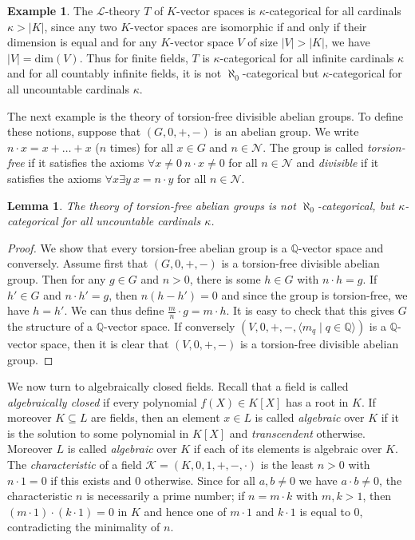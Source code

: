 \documentclass[10pt]{amsart}
\renewcommand{\L}{\mathcal{L}}
\newcommand{\QQ}{\mathbb{Q}}
\newcommand{\NN}{\mathcal{N}}
\newcommand{\KK}{\mathcal{K}}
\newtheorem{lemma}[theorem]{Lemma}
\theoremstyle{definition}
\newtheorem{example}[theorem]{Example}
\theoremstyle{remark}
\begin{document}
\begin{example} 
The $\L$-theory $T$ of $K$-vector spaces is $\kappa$-categorical for all cardinals $\kappa>|K|$, since any two $K$-vector spaces are isomorphic if and only if their dimension is equal and for any $K$-vector space $V$ of size $|V|>|K|$, we have $|V|=\mathrm{dim}(V)$. Thus for finite fields, $T$ is $\kappa$-categorical for all infinite cardinals $\kappa$ and for all countably infinite fields, it is not $\aleph_0$-categorical but $\kappa$-categorical for all uncountable cardinals $\kappa$. 
\end{example} 

The next example is the theory of torsion-free divisible abelian groups. To define these notions, suppose that $(G,0,+,-)$ is an abelian group. We write $n\cdot x= x+\dots+x$ ($n$ times) for all $x\in G$ and $n\in\NN$. The group is called \emph{torsion-free} if it satisfies the axioms $\forall x\neq 0\ n \cdot x\neq 0$ for all $n\in\NN$ and \emph{divisible} if it satisfies the axioms $\forall x\exists y\ x=n\cdot y$ for all $n\in\NN$. 

\begin{lemma} 
The theory of torsion-free abelian groups is not $\aleph_0$-categorical, but $\kappa$-categorical for all uncountable cardinals $\kappa$. 
\end{lemma} 
\begin{proof} 
We show that every torsion-free abelian group is a $\QQ$-vector space and conversely. Assume first that $(G,0,+,-)$ is a torsion-free divisible abelian group. Then for any $g\in G$ and $n>0$, there is some $h\in G$ with $n\cdot h=g$. If $h'\in G$ and $n\cdot h'=g$, then $n(h-h')=0$ and since the group is torsion-free, we have $h=h'$. We can thus define $\frac{m}{n}\cdot g= m\cdot h$. It is easy to check that this gives $G$ the structure of a $\QQ$-vector space. If conversely $(V,0,+,-,\langle m_q\mid q\in\QQ\rangle)$ is a $\QQ$-vector space, then it is clear that $(V,0,+,-)$ is a torsion-free divisible abelian group. 
\end{proof} 

We now turn to algebraically closed fields. Recall that a field is called \emph{algebraically closed} if every polynomial $f(X)\in K[X]$ has a root in $K$. If moreover $K\subseteq L$ are fields, then an element $x\in L$ is called \emph{algebraic} over $K$ if it is the solution  to some polynomial in $K[X]$ and \emph{transcendent} otherwise. Moreover $L$ is called \emph{algebraic} over $K$ if each of its elements is algebraic over $K$. The \emph{characteristic} of a field $\KK=(K,0,1,+,-,\cdot)$ is the least $n>0$ with $n\cdot 1=0$ if this exists and $0$ otherwise. Since for all $a,b\neq 0$ we have $a\cdot b\neq 0$,  the characteristic $n$ is necessarily a prime number; if $n=m\cdot k$ with $m,k>1$, then $(m\cdot 1)\cdot (k\cdot 1)=0$ in $K$ and hence one of $m\cdot 1$ and $k\cdot 1$ is equal to $0$, contradicting the minimality of $n$. 
\end{document}
